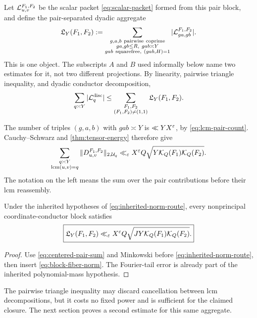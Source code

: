 Let \(\mathcal L_{u,v}^{F_1,F_2}\) be the scalar packet
\eqref{eq:scalar-packet} formed from this pair block, and define the
pair-separated dyadic aggregate
\begin{equation}
 \mathfrak L_Y(F_1,F_2)
 :=\sum_{\substack{g,a,b\ {\rm pairwise\ coprime}\\
                   ga,gb\le R,\ gab\asymp Y\\
                   gab\ {\rm squarefree},\ (gab,H)=1}}
 |\mathcal L_{ga,gb}^{F_1,F_2}|.
 \label{eq:pair-separated-scalar-block}
\end{equation}
This is one object.  The subscripts \(A\) and \(B\) used informally
below name two estimates for it, not two different projections.  By
linearity, pairwise triangle inequality, and dyadic conductor
decomposition,
\begin{equation}
 \sum_{q\asymp Y}|\mathcal L_q^{\rm disc}|
 \le\sum_{\substack{F_1,F_2\\(F_1,F_2)\ne(1,1)}}
 \mathfrak L_Y(F_1,F_2).
 \label{eq:block-reassembly-inequality}
\end{equation}

The number of triples \((g,a,b)\) with \(gab\asymp Y\) is
\(\ll YX^\varepsilon\), by \eqref{eq:lcm-pair-count}.  Cauchy--Schwarz and
\cref{thm:tensor-energy} therefore give
\begin{equation}
 \sum_{\substack{q\asymp Y\\\operatorname{lcm}(u,v)=q}}
 \|D_{u,v}^{F_1,F_2}\|_{2,\mathcal U_q}
 \ll_\varepsilon
 X^\varepsilon Q\sqrt{Y\mathcal K_Q(F_1)\mathcal K_Q(F_2)}.
 \label{eq:block-fiber-norm}
\end{equation}
The notation on the left means the sum over the pair contributions
before their lcm reassembly.

\begin{corollary}
\label{cor:tensor-norm-route}
Under the inherited hypotheses of \eqref{eq:inherited-norm-route}, every
nonprincipal coordinate-conductor block satisfies
\begin{equation}
 \boxed{
 \mathfrak L_Y(F_1,F_2)
 \ll_\varepsilon X^\varepsilon Q
 \sqrt{JY\mathcal K_Q(F_1)\mathcal K_Q(F_2)}.}
 \label{eq:tensor-norm-scalar}
\end{equation}
\end{corollary}

\begin{proof}
Use \eqref{eq:centered-pair-sum} and Minkowski before
\eqref{eq:inherited-norm-route}, then insert
\eqref{eq:block-fiber-norm}.  The Fourier-tail error is already part of
the inherited polynomial-mass hypothesis.
\end{proof}

The pairwise triangle inequality may discard cancellation between lcm
decompositions, but it costs no fixed power and is sufficient for the
claimed closure.  The next section proves a second estimate for this
same aggregate.
